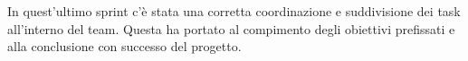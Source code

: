 In quest'ultimo sprint c'è stata una corretta coordinazione e suddivisione dei task all'interno del team. Questa ha portato al compimento degli obiettivi prefissati e alla conclusione con successo del progetto.